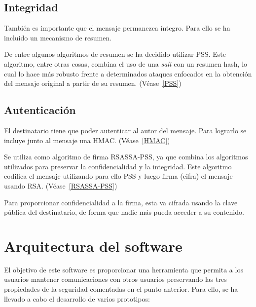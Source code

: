 \subsection{Integridad}

También es importante que el mensaje permanezca íntegro. Para ello se ha
incluido un mecanismo de resumen.

De entre algunos algoritmos de resumen se ha decidido utilizar PSS. Este
algoritmo, entre otras cosas, combina el uso de una \emph{salt} con un resumen
hash, lo cual lo hace más robusto frente a determinados ataques enfocados en la
obtención del mensaje original a partir de su resumen. (Véase~\ref{PSS})

\subsection{Autenticación}

El destinatario tiene que poder autenticar al autor del mensaje. Para lograrlo
se incluye junto al mensaje una HMAC. (Véase~\ref{HMAC})

Se utiliza como algoritmo de firma RSASSA-PSS, ya que combina los algoritmos
utilizados para preservar la confidencialidad y la integridad. Este algoritmo
codifica el mensaje utilizando para ello PSS y luego firma (cifra) el mensaje
usando RSA. (Véase~\ref{RSASSA-PSS})

Para proporcionar confidencialidad a la firma, esta va cifrada usando la clave
pública del destinatario, de forma que nadie más pueda acceder a su contenido.


\section{Arquitectura del software}

El objetivo de este software es proporcionar una herramienta que permita a los
usuarios mantener comunicaciones con otros usuarios preservando las tres
propiedades de la seguridad comentadas en el punto anterior. Para ello, se ha
llevado a cabo el desarrollo de varios prototipos:

